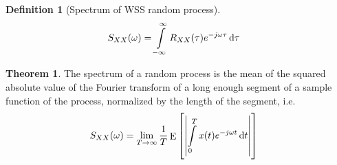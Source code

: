 \documentclass[titlepage, fleqn, a4paper, 12pt, twoside]{article}
\theoremstyle{definition}
\newtheorem{definition}{Definition}
\theoremstyle{theorem}
\newtheorem{theorem}{Theorem}
\DeclareMathOperator{\expct}{\mathrm{E}}
\begin{document}
\begin{definition}[Spectrum of WSS random process]
	\begin{align*}
		S_{X X}(\omega) &= \int\limits_{-\infty}^{\infty} R_{X X}(\tau) e^{-j \omega \tau} \dif \tau
	\end{align*}
\end{definition}


\begin{theorem}
	The spectrum of a random process is the mean of the squared absolute value of the Fourier transform of a long enough segment of a sample function of the process, normalized by the length of the segment, i.e.
	\begin{align*}
		S_{X X}(\omega) &= \lim\limits_{T \to \infty} \frac{1}{T} \expct\left[ \left| \int\limits_{0}^{T} x(t) e^{-j \omega t} \dif t \right| \right]
	\end{align*}
\end{theorem}
\end{document}
